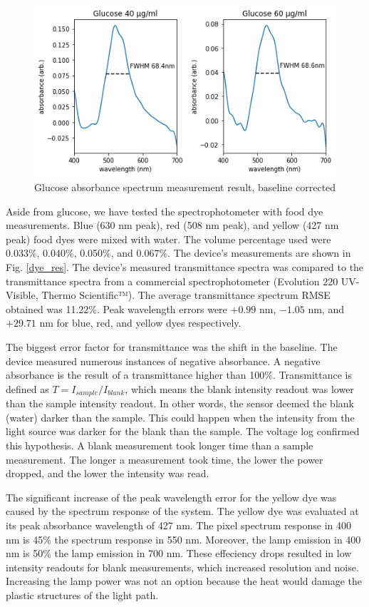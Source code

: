\documentclass[conference]{IEEEtran}
\begin{document}
    \begin{figure}[htbp]
    \centerline{\includegraphics[scale=0.5]{glucose-res.png}}
    \caption{Glucose absorbance spectrum measurement result, baseline corrected}
    \label{glucose_result}
    \end{figure}

Aside from glucose, we have tested the spectrophotometer with food dye measurements.
Blue (630 nm peak), red (508 nm peak), and yellow (427 nm peak) food dyes were mixed with water.
The volume percentage used were 0.033\%, 0.040\%, 0.050\%, and 0.067\%.
The device's measurements are shown in Fig. \ref{dye_res}.
The device's measured transmittance spectra was compared to the transmittance spectra from a commercial spectrophotometer (Evolution 220 UV-Visible, Thermo Scientific™).
The average transmittance spectrum RMSE obtained was 11.22\%.
Peak wavelength errors were $+0.99$ nm, $-1.05$ nm, and $+29.71$ nm for blue, red, and yellow dyes respectively.

The biggest error factor for transmittance was the shift in the baseline.
The device measured numerous instances of negative absorbance.
A negative absorbance is the result of a transmittance higher than 100\%.
Transmittance is defined as $T=I_{sample}/I_{blank}$, which means the blank intensity readout was lower than the sample intensity readout.
In other words, the sensor deemed the blank (water) darker than the sample.
This could happen when the intensity from the light source was darker for the blank than the sample.
The voltage log confirmed this hypothesis.
A blank measurement took longer time than a sample measurement.
The longer a measurement took time, the lower the power dropped, and the lower the intensity was read.

The significant increase of the peak wavelength error for the yellow dye was caused by the spectrum response of the system.
The yellow dye was evaluated at its peak absorbance wavelength of 427 nm.
The pixel spectrum response in 400 nm is 45\% the spectrum response in 550 nm.
Moreover, the lamp emission in 400 nm is 50\% the lamp emission in 700 nm.
These effeciency drops resulted in low intensity readouts for blank measurements, which increased resolution and noise.
Increasing the lamp power was not an option because the heat would damage the plastic structures of the light path. 
\end{document}
